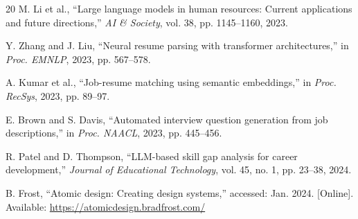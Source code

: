 \documentclass[conference]{IEEEtran}
\begin{document}
\begin{thebibliography}{20}
M. Li et al., ``Large language models in human resources: Current applications and future directions,'' \textit{AI \& Society}, vol. 38, pp. 1145--1160, 2023.

Y. Zhang and J. Liu, ``Neural resume parsing with transformer architectures,'' in \textit{Proc. EMNLP}, 2023, pp. 567--578.

A. Kumar et al., ``Job-resume matching using semantic embeddings,'' in \textit{Proc. RecSys}, 2023, pp. 89--97.

E. Brown and S. Davis, ``Automated interview question generation from job descriptions,'' in \textit{Proc. NAACL}, 2023, pp. 445--456.

R. Patel and D. Thompson, ``LLM-based skill gap analysis for career development,'' \textit{Journal of Educational Technology}, vol. 45, no. 1, pp. 23--38, 2024.

B. Frost, ``Atomic design: Creating design systems,'' accessed: Jan. 2024. [Online]. Available: \url{https://atomicdesign.bradfrost.com/}

\end{thebibliography}
\end{document}
